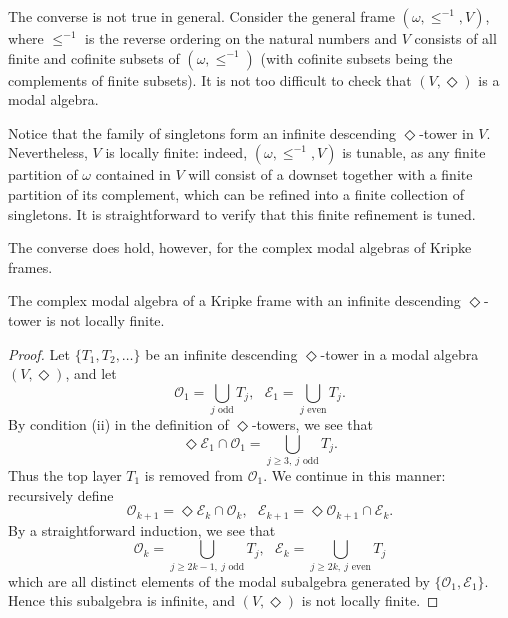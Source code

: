 \documentclass[submission]{eptcs}
\begin{document}
\begin{remark}
    The converse is not true in general. 
    Consider the general frame $(\omega,\leq^{-1},V)$, where $\leq^{-1}$ is the reverse ordering on the natural numbers and $V$ consists of all finite and cofinite subsets of $(\omega,\leq^{-1})$ (with cofinite subsets being the complements of finite subsets).
    It is not too difficult to check that $(V,\Diamond)$ is a modal algebra.
    \par
    Notice that the family of singletons form an infinite descending $\Diamond$-tower in $V$. Nevertheless, $V$ is locally finite:
    indeed, $(\omega,\leq^{-1},V)$ is tunable, as
    any finite partition of $\omega$ contained in $V$ will consist of a downset together with a finite partition of its complement, which can be refined into a finite collection of singletons. It is straightforward to verify that this finite refinement is tuned.
\end{remark}
The converse does hold, however, for the complex modal algebras of Kripke frames.

\begin{proposition} \label{prop:complete_implies_tower_implies_not_locally_finite}
    The complex modal algebra of a Kripke frame with an infinite descending $\Diamond$-tower is not locally finite. 
\end{proposition}

\begin{proof}
    Let $\{T_1,T_2,\dots\}$ be an infinite descending $\Diamond$-tower in a modal algebra $(V,\Diamond)$, and let
    \[
    \mathcal{O}_1=\bigcup_{j \text{ odd}}T_j, \ \ \
    \mathcal{E}_1=\bigcup_{j \text{ even}}T_j.
    \]
    By condition (ii) in the definition of $\Diamond$-towers, we see that
    \[
    \Diamond \mathcal{E}_1\cap \mathcal{O}_1= \bigcup_{j\geq 3, \ j \text{ odd}}T_j.
    \]
    Thus the top layer $T_1$ is removed from $\mathcal{O}_1$. We continue in this manner: recursively define
    \[
    \mathcal{O}_{k+1}=\Diamond \mathcal{E}_k \cap \mathcal{O}_k, \ \ \
    \mathcal{E}_{k+1}=\Diamond \mathcal{O}_{k+1} \cap \mathcal{E}_k.
    \]
    By a straightforward induction, we see that
    \[
    \mathcal{O}_k = \bigcup_{j\geq 2k-1, \ j \text{ odd}}T_j, \ \ \ 
    \mathcal{E}_k = \bigcup_{j\geq 2k, \ j \text{ even}}T_j
    \]
    which are all distinct elements of the modal subalgebra generated by $\{\mathcal{O}_1,\mathcal{E}_1\}$.
    Hence this subalgebra is infinite, and $(V,\Diamond)$ is not locally finite.
\end{proof}
\end{document}
